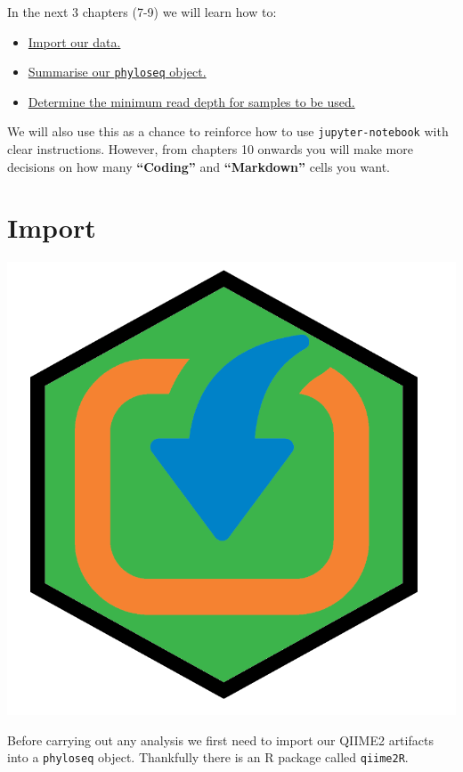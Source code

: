 \documentclass[
]{book}
\providecommand{\tightlist}{%
  \setlength{\itemsep}{0pt}\setlength{\parskip}{0pt}}
\begin{document}
In the next 3 chapters (7-9) we will learn how to:

\begin{itemize}
\tightlist
\item
  \protect\hyperlink{import_chap}{Import our data.}
\item
  \protect\hyperlink{sum_phyloseq_chap}{Summarise our \texttt{phyloseq} object.}
\item
  \protect\hyperlink{mindepthchap}{Determine the minimum read depth for samples to be used.}
\end{itemize}

We will also use this as a chance to reinforce how to use \texttt{jupyter-notebook} with clear instructions.
However, from chapters 10 onwards you will make more decisions on how many \textbf{``Coding''} and \textbf{``Markdown''} cells you want.

\hypertarget{import_chap}{%
\chapter{Import}\label{import_chap}}

\includegraphics{figures/import.png}

Before carrying out any analysis we first need to import our QIIME2 artifacts into a \texttt{phyloseq} object. Thankfully there is an R package called \texttt{qiime2R}.
\end{document}
